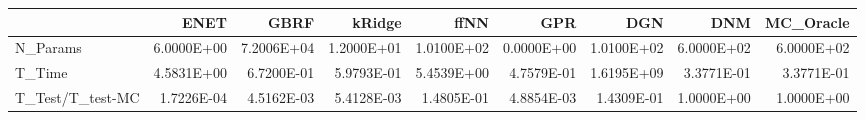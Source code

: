 \begin{tabular}{lrrrrrrrr}
\toprule
{} &       ENET &       GBRF &     kRidge &       ffNN &        GPR &        DGN &        DNM &  MC\_Oracle \\
\midrule
N\_Params         & 6.0000E+00 & 7.2006E+04 & 1.2000E+01 & 1.0100E+02 & 0.0000E+00 & 1.0100E+02 & 6.0000E+02 & 6.0000E+02 \\
T\_Time           & 4.5831E+00 & 6.7200E-01 & 5.9793E-01 & 5.4539E+00 & 4.7579E-01 & 1.6195E+09 & 3.3771E-01 & 3.3771E-01 \\
T\_Test/T\_test-MC & 1.7226E-04 & 4.5162E-03 & 5.4128E-03 & 1.4805E-01 & 4.8854E-03 & 1.4309E-01 & 1.0000E+00 & 1.0000E+00 \\
\bottomrule
\end{tabular}
